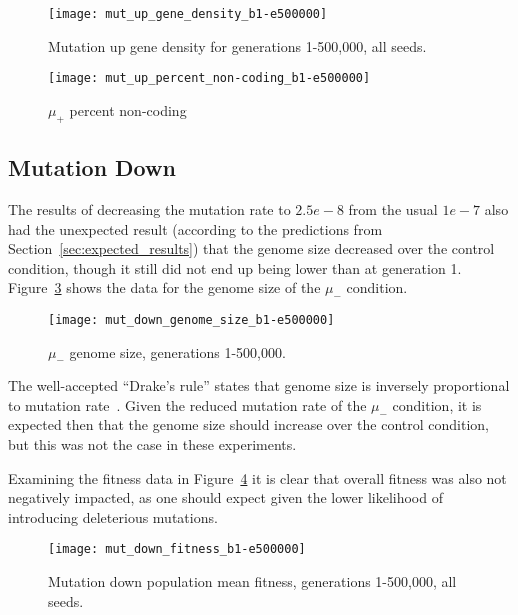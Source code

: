 \begin{figure}[h]
	\centering
	\texttt{[image: mut\_up\_gene\_density\_b1-e500000]}
	\caption[Mutation up gene density]{Mutation up gene density for generations 1-500,000, all seeds.}
	\label{fig:mut_up_gene_density}
\end{figure}

\begin{figure}[h]
	\centering
	\texttt{[image: mut\_up\_percent\_non-coding\_b1-e500000]}
	\caption[Mutation up - percent non-coding]{$\mu_+$ percent non-coding}
	\label{fig:mut_up_percent_non-coding}
\end{figure}

\subsection{Mutation Down}
The results of decreasing the mutation rate to $2.5e-8$ from the usual $1e-7$ also had the unexpected result (according to the predictions from Section~\ref{sec:expected_results}) that the genome size decreased over the control condition, though it still did not end up being lower than at generation 1. Figure~\ref{fig:mut_down:genome_size} shows the data for the genome size of the $\mu_-$ condition.
\begin{figure}[H]
	\centering
	\texttt{[image: mut\_down\_genome\_size\_b1-e500000]}
	\caption[Mutation down genome size]{$\mu_-$ genome size, generations 1-500,000.}
	\label{fig:mut_down:genome_size}
\end{figure}

The well-accepted ``Drake's rule'' states that genome size is inversely proportional to mutation rate~\cite{drake1991constant}. Given the reduced mutation rate of the $\mu_-$ condition, it is expected then that the genome size should increase over the control condition, but this was not the case in these experiments. 

Examining the fitness data in Figure~\ref{fig:mut_down_fitness} it is clear that overall fitness was also not negatively impacted, as one should expect given the lower likelihood of introducing deleterious mutations. 

\begin{figure}[h]
	\centering
	\texttt{[image: mut\_down\_fitness\_b1-e500000]}
	\caption[Mutation down fitness]{Mutation down population mean fitness, generations 1-500,000, all seeds.}
	\label{fig:mut_down_fitness}
\end{figure} 

